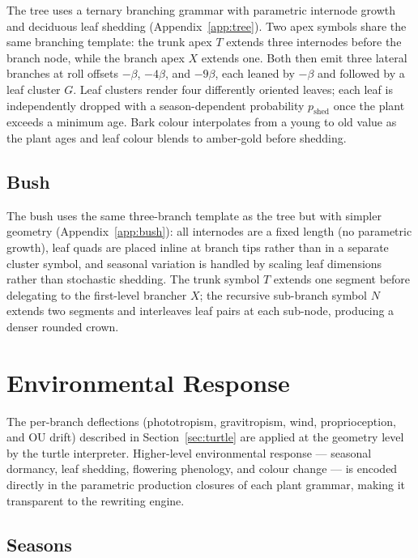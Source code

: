 The tree uses a ternary branching grammar with parametric internode growth and deciduous leaf shedding
(Appendix~\ref{app:tree}). Two apex symbols share the same branching template: the trunk apex $T$ extends
three internodes before the branch node, while the branch apex $X$ extends one. Both then emit three lateral
branches at roll offsets $-\beta$, $-4\beta$, and $-9\beta$, each leaned by $-\beta$ and followed by a leaf
cluster $G$. Leaf clusters render four differently oriented leaves; each leaf is independently dropped with
a season-dependent probability $p_{\mathrm{shed}}$ once the plant exceeds a minimum age. Bark colour
interpolates from a young to old value as the plant ages and leaf colour blends to amber-gold before shedding.

\subsection{Bush}

The bush uses the same three-branch template as the tree but with simpler geometry (Appendix~\ref{app:bush}):
all internodes are a fixed length (no parametric growth), leaf quads are placed inline at branch tips rather
than in a separate cluster symbol, and seasonal variation is handled by scaling leaf dimensions rather than
stochastic shedding. The trunk symbol $T$ extends one segment before delegating to the first-level brancher
$X$; the recursive sub-branch symbol $N$ extends two segments and interleaves leaf pairs at each sub-node,
producing a denser rounded crown.

\section{Environmental Response}

The per-branch deflections (phototropism, gravitropism, wind, proprioception, and OU drift) described in
Section~\ref{sec:turtle} are applied at the geometry level by the turtle interpreter. Higher-level
environmental response --- seasonal dormancy, leaf shedding, flowering phenology, and colour change --- is
encoded directly in the parametric production closures of each plant grammar, making it transparent to the
rewriting engine.

\subsection{Seasons}
\label{sec:seasons}

